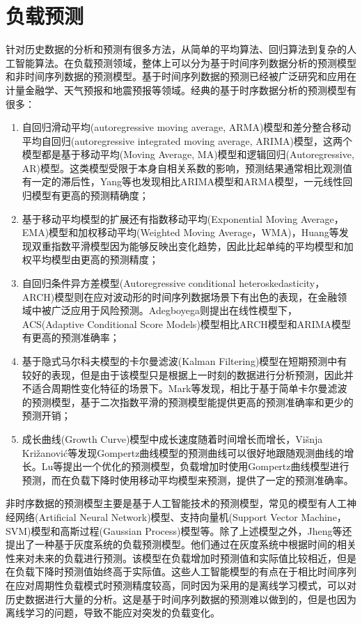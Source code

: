 \section{负载预测}
针对历史数据的分析和预测有很多方法，从简单的平均算法、回归算法到复杂的人工智能算法。在负载预测领域，整体上可以分为基于时间序列数据\cite{hamilton1994time}分析的预测模型和非时间序列数据的预测模型。基于时间序列数据的预测已经被广泛研究和应用在计量金融学、天气预报和地震预报等领域。经典的基于时序数据分析的预测模型有很多：
\begin{enumerate}
\item 自回归滑动平均(autoregressive moving average, ARMA)模型和差分整合移动平均自回归(autoregressive integrated moving average, ARIMA)模型，这两个模型都是基于移动平均(Moving Average, MA)模型和逻辑回归(Autoregressive, AR)模型\cite{box2015time}。这类模型受限于本身自相关系数的影响，预测结果通常相比观测值有一定的滞后性，Yang等也发现相比ARIMA模型和ARMA模型，一元线性回归模型有更高的预测精确度\cite{yang2013workload}；
\item 基于移动平均模型的扩展还有指数移动平均(Exponential Moving Average，EMA)模型\cite{xiao2013dynamic}和加权移动平均(Weighted Moving Average，WMA)\cite{wu1989time}，Huang等发现双重指数平滑模型因为能够反映出变化趋势，因此比起单纯的平均模型和加权平均模型由更高的预测精度\cite{huang2012resource}；
\item 自回归条件异方差模型(Autoregressive conditional heteroskedasticity，ARCH)模型\cite{bollerslev1986generalized}则在应对波动形的时间序列数据场景下有出色的表现，在金融领域中被广泛应用于风险预测。Adegboyega则提出在线性模型下，ACS(Adaptive Conditional Score Models)模型相比ARCH模型和ARIMA模型有更高的预测准确率\cite{adegboyega2015dynamic}；
\item 基于隐式马尔科夫模型的卡尔曼滤波(Kalman Filtering)模型\cite{goodwin2014adaptive}在短期预测中有较好的表现，但是由于该模型只是根据上一时刻的数据进行分析预测，因此并不适合周期性变化特征的场景下。Mark等发现，相比于基于简单卡尔曼滤波的预测模型，基于二次指数平滑的预测模型能提供更高的预测准确率和更少的预测开销\cite{mark2011evolutionary}；
\item 成长曲线(Growth Curve)模型中成长速度随着时间增长而增长，Višnja Križanović等发现Gompertz曲线模型的预测曲线可以很好地跟随观测曲线的增长\cite{vcik2016comparison}。Lu等提出一个优化的预测模型，负载增加时使用Gompertz曲线模型进行预测，而在负载下降时使用移动平均模型来预测，提供了一定的预测准确率\cite{lu2014dynamic}。
\end{enumerate}

非时序数据的预测模型主要是基于人工智能技术的预测模型，常见的模型有人工神经网络(Artificial Neural Network)模型、支持向量机(Support Vector Machine，SVM)模型和高斯过程(Gaussian Process)模型等。除了上述模型之外，Jheng等还提出了一种基于灰度系统的负载预测模型\cite{jheng2014novel}。他们通过在灰度系统中根据时间的相关性来对未来的负载进行预测。该模型在负载增加时预测值和实际值比较相近，但是在负载下降时预测值始终高于实际值。这些人工智能模型的有点在于相比时间序列在应对周期性负载模式时预测精度较高，同时因为采用的是离线学习模式，可以对历史数据进行大量的分析。这是基于时间序列数据的预测难以做到的，但是也因为离线学习的问题，导致不能应对突发的负载变化。

